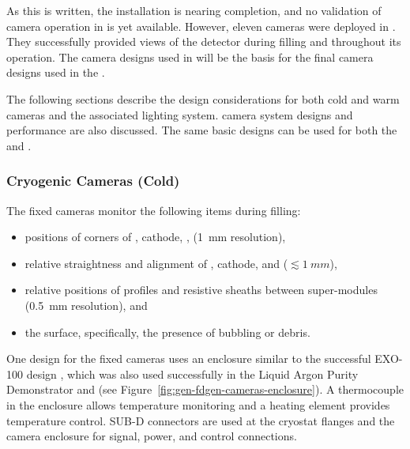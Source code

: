 As this is written, the  installation is nearing completion, and no validation of camera operation in  is yet available. However,
eleven cameras were deployed in .
They successfully provided views of the detector during filling and throughout
its operation. The camera designs used in  will be the basis for the final camera designs used in the .



The following sections describe the design considerations for both cold
and warm cameras and the associated lighting system.  camera system designs and performance are also discussed.  
The same basic
designs can be used for both the \single and \dual {}.



\subsubsection{Cryogenic Cameras (Cold)}

The fixed cameras
monitor the following items during filling:
\begin{itemize}
\item positions of corners of , cathode, ,  (\SI{1}{mm} resolution),
\item relative straightness and alignment of , cathode, and  (\(\lesssim\SI{1}{mm}\)),
\item relative positions of  profiles and resistive sheaths between super-modules (\SI{0.5}{mm} resolution), and 
\item the \lar surface, specifically, the presence of bubbling or debris.
\end{itemize}




One design for the  fixed cameras uses an enclosure similar to
the successful EXO-100 design \cite{Delaquis:2013hva}, which was also
used successfully in the Liquid Argon Purity Demonstrator
and  (see Figure~\ref{fig:gen-fdgen-cameras-enclosure}).
A thermocouple in the enclosure allows temperature monitoring and a heating element provides temperature control.  
SUB-D 
connectors are used at the cryostat flanges and the camera enclosure for signal, power, and control connections.


